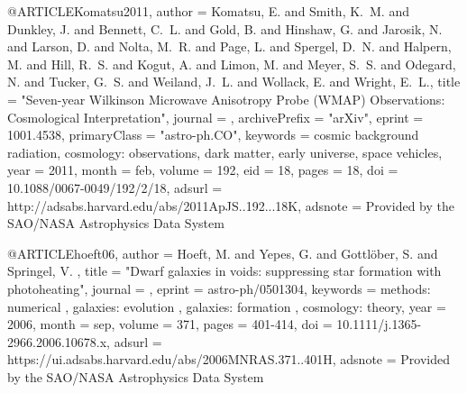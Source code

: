 \documentclass{aa}
\begin{document}
{{{@ARTICLE{Komatsu2011,
   author = {{Komatsu}, E. and {Smith}, K.~M. and {Dunkley}, J. and {Bennett}, C.~L. and 
	{Gold}, B. and {Hinshaw}, G. and {Jarosik}, N. and {Larson}, D. and 
	{Nolta}, M.~R. and {Page}, L. and {Spergel}, D.~N. and {Halpern}, M. and 
	{Hill}, R.~S. and {Kogut}, A. and {Limon}, M. and {Meyer}, S.~S. and 
	{Odegard}, N. and {Tucker}, G.~S. and {Weiland}, J.~L. and {Wollack}, E. and 
	{Wright}, E.~L.},
    title = "{Seven-year Wilkinson Microwave Anisotropy Probe (WMAP) Observations: Cosmological Interpretation}",
  journal = {\apjs},
archivePrefix = "arXiv",
   eprint = {1001.4538},
 primaryClass = "astro-ph.CO",
 keywords = {cosmic background radiation, cosmology: observations, dark matter, early universe, space vehicles},
     year = 2011,
    month = feb,
   volume = 192,
      eid = {18},
    pages = {18},
      doi = {10.1088/0067-0049/192/2/18},
   adsurl = {http://adsabs.harvard.edu/abs/2011ApJS..192...18K},
  adsnote = {Provided by the SAO/NASA Astrophysics Data System}
}

@ARTICLE{hoeft06,
   author = {{Hoeft}, M. and {Yepes}, G. and {Gottl{\"o}ber}, S. and {Springel}, V.
	},
    title = "{Dwarf galaxies in voids: suppressing star formation with photoheating}",
  journal = {\mnras},
   eprint = {astro-ph/0501304},
 keywords = {methods: numerical , galaxies: evolution , galaxies: formation , cosmology: theory},
     year = 2006,
    month = sep,
   volume = 371,
    pages = {401-414},
      doi = {10.1111/j.1365-2966.2006.10678.x},
   adsurl = {https://ui.adsabs.harvard.edu/abs/2006MNRAS.371..401H},
  adsnote = {Provided by the SAO/NASA Astrophysics Data System}
}

}}}
\end{document}
